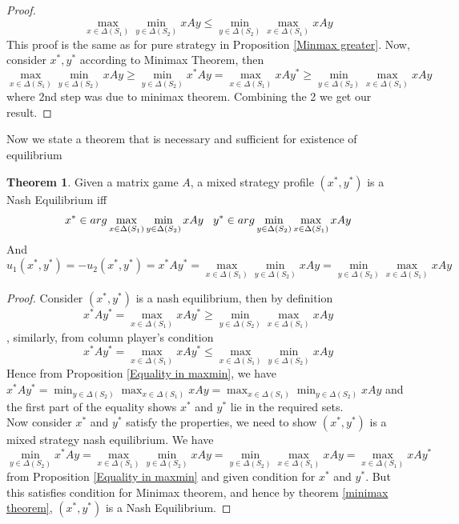 \documentclass{article}
\theoremstyle{definition}
\newtheorem{theorem}{Theorem}[section]
\begin{document}
\begin{proof}
$$\max_{x\in \Delta(S_1)}\min_{y\in \Delta(S_2)} xAy \leq \min_{y\in \Delta(S_2)}\max_{x\in \Delta(S_1)} xAy$$
This proof is the same as for pure strategy in Proposition \ref{Minmax greater}. Now, consider $x^*, y^*$ according to Minimax Theorem, then $$\max_{x\in \Delta(S_1)}\min_{y\in \Delta(S_2)} xAy \geq \min_{y\in \Delta(S_2)} x^*Ay = \max_{x\in \Delta(S_1)} xAy^* \geq  \min_{y\in \Delta(S_2)}\max_{x\in \Delta(S_1)} xAy$$ where 2nd step was due to minimax theorem. Combining the 2 we get our result.
\end{proof}
Now we state a theorem that is necessary and sufficient for existence of equilibrium
\begin{theorem}
Given a matrix game $A$, a mixed strategy profile $(x^*,y^*)$ is a Nash Equilibrium iff $$x^*\in arg \max_{x\in \Delta(S_1)}\min_{y\in \Delta(S_2)} xAy \hspace{3mm} y^*\in arg \min_{y\in \Delta(S_2)} \max_{x\in \Delta(S_1)} xAy$$ And $$u_1(x^*,y^*) = -u_2(x^*,y^*) = x^*Ay^* = \max_{x\in \Delta(S_1)}\min_{y\in \Delta(S_2)} xAy = \min_{y\in \Delta(S_2)} \max_{x\in \Delta(S_1)} xAy$$
\end{theorem}
\begin{proof}
Consider $(x^*,y^*)$ is a nash equilibrium, then by definition $$x^*Ay^* = \max_{x\in \Delta(S_1)} xAy^* \geq \min_{y\in \Delta(S_2)}\max_{x\in \Delta(S_1)} xAy$$, similarly, from column player's condition 
$$ x^*Ay^* = \max_{x\in \Delta(S_1)} xAy^* \leq \max_{x\in \Delta(S_1)}\min_{y\in \Delta(S_2)} xAy$$ Hence from Proposition \ref{Equality in maxmin}, we have $x^*Ay^* = \min_{y\in \Delta(S_2)}\max_{x\in \Delta(S_1)} xAy =\max_{x\in \Delta(S_1)}\min_{y\in \Delta(S_2)} xAy$ and the first part of the equality shows $x^*$ and $y^*$ lie in the required sets.\\
Now consider $x^*$ and $y^*$ satisfy the properties, we need to show $(x^*,y^*)$ is a mixed strategy nash equilibrium. We have $$\min_{y\in \Delta(S_2)} x^*Ay = \max_{x\in \Delta(S_1)}\min_{y\in \Delta(S_2)} xAy = \min_{y\in \Delta(S_2)} \max_{x\in \Delta(S_1)} xAy = \max_{x\in \Delta(S_1)} xAy^*$$ from Proposition \ref{Equality in maxmin} and given condition for $x^*$ and $y^*$. But this satisfies condition for Minimax theorem, and hence by theorem \ref{minimax theorem}, $(x^*,y^*)$ is a Nash Equilibrium.
\end{proof}
\end{document}
